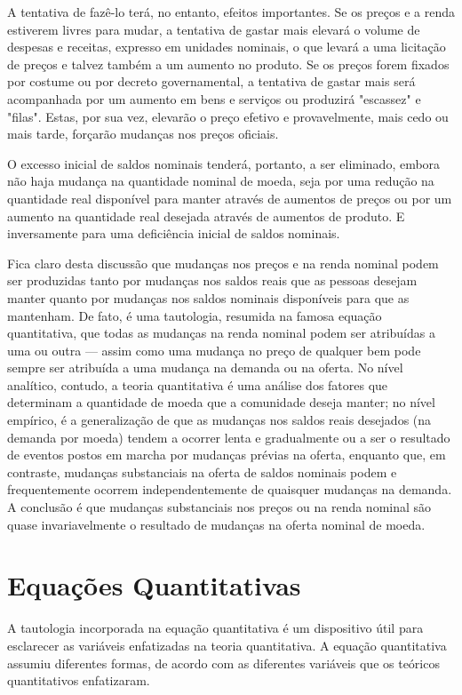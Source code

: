 \documentclass[12pt]{article}
\begin{document}
A tentativa de fazê-lo terá, no entanto, efeitos importantes. Se os preços e a renda estiverem livres para mudar, a tentativa de gastar mais elevará o volume de despesas e receitas, expresso em unidades nominais, o que levará a uma licitação de preços e talvez também a um aumento no produto. Se os preços forem fixados por costume ou por decreto governamental, a tentativa de gastar mais será acompanhada por um aumento em bens e serviços ou produzirá "escassez" e "filas". Estas, por sua vez, elevarão o preço efetivo e provavelmente, mais cedo ou mais tarde, forçarão mudanças nos preços oficiais.

O excesso inicial de saldos nominais tenderá, portanto, a ser eliminado, embora não haja mudança na quantidade nominal de moeda, seja por uma redução na quantidade real disponível para manter através de aumentos de preços ou por um aumento na quantidade real desejada através de aumentos de produto. E inversamente para uma deficiência inicial de saldos nominais.

Fica claro desta discussão que mudanças nos preços e na renda nominal podem ser produzidas tanto por mudanças nos saldos reais que as pessoas desejam manter quanto por mudanças nos saldos nominais disponíveis para que as mantenham. De fato, é uma tautologia, resumida na famosa equação quantitativa, que todas as mudanças na renda nominal podem ser atribuídas a uma ou outra — assim como uma mudança no preço de qualquer bem pode sempre ser atribuída a uma mudança na demanda ou na oferta. No nível analítico, contudo, a teoria quantitativa é uma análise dos fatores que determinam a quantidade de moeda que a comunidade deseja manter; no nível empírico, é a generalização de que as mudanças nos saldos reais desejados (na demanda por moeda) tendem a ocorrer lenta e gradualmente ou a ser o resultado de eventos postos em marcha por mudanças prévias na oferta, enquanto que, em contraste, mudanças substanciais na oferta de saldos nominais podem e frequentemente ocorrem independentemente de quaisquer mudanças na demanda. A conclusão é que mudanças substanciais nos preços ou na renda nominal são quase invariavelmente o resultado de mudanças na oferta nominal de moeda.

\section{Equações Quantitativas}

A tautologia incorporada na equação quantitativa é um dispositivo útil para esclarecer as variáveis enfatizadas na teoria quantitativa. A equação quantitativa assumiu diferentes formas, de acordo com as diferentes variáveis que os teóricos quantitativos enfatizaram.
\end{document}
